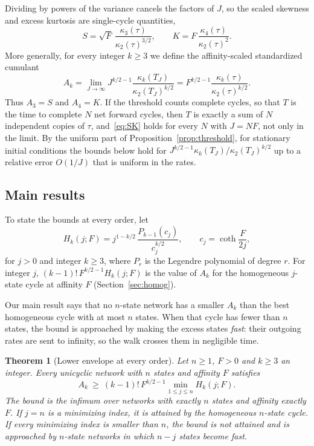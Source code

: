 \documentclass[11pt]{article}
\newtheorem{theorem}{Theorem}
\theoremstyle{remark}
\begin{document}
Dividing by powers of the variance cancels the factors of $J$, so the scaled
skewness and excess kurtosis are single-cycle quantities,
\begin{equation}\label{eq:SK}
S=\sqrt F\,\frac{\kappa_3(\tau)}{\kappa_2(\tau)^{3/2}},\qquad
K=F\,\frac{\kappa_4(\tau)}{\kappa_2(\tau)^2}.
\end{equation}
More generally, for every integer $k\ge3$ we define the affinity-scaled
standardized cumulant
\begin{equation}\label{eq:Ak}
A_k=\lim_{J\to\infty}J^{k/2-1}\frac{\kappa_k(T_J)}{\kappa_2(T_J)^{k/2}}
=F^{k/2-1}\frac{\kappa_k(\tau)}{\kappa_2(\tau)^{k/2}}.
\end{equation}
Thus $A_3=S$ and $A_4=K$. If the threshold counts complete cycles, so that
$T$ is the time to complete $N$ net forward cycles, then $T$ is exactly a sum
of $N$ independent copies of $\tau$, and~\eqref{eq:SK} holds for every $N$
with $J=NF$, not only in the limit. By the uniform part of
Proposition~\ref{prop:threshold}, for stationary initial conditions the
bounds below hold for $J^{k/2-1}\kappa_k(T_J)/\kappa_2(T_J)^{k/2}$ up to a
relative error $O(1/J)$ that is uniform in the rates.

\subsection{Main results}

To state the bounds at every order, let
\begin{equation}\label{eq:Hk}
H_k(j;F)=j^{1-k/2}\,\frac{P_{k-1}(c_j)}{c_j^{k/2}},\qquad
c_j=\coth\frac F{2j},
\end{equation}
for $j>0$ and integer $k\ge3$, where $P_r$ is the Legendre polynomial of
degree $r$. For integer $j$, $(k-1)!\,F^{k/2-1}H_k(j;F)$ is the value of
$A_k$ for the homogeneous $j$-state cycle at affinity $F$
(Section~\ref{sec:homog}).

Our main result says that no $n$-state network has a smaller $A_k$ than the
best homogeneous cycle with at most $n$ states. When that cycle has fewer
than $n$ states, the bound is approached by making the excess states
\emph{fast}: their outgoing rates are sent to infinity, so the walk crosses
them in negligible time.

\begin{theorem}[Lower envelope at every order]\label{thm:allorder}
Let $n\ge1$, $F>0$ and $k\ge3$ an integer. Every unicyclic network with $n$
states and affinity $F$ satisfies
\begin{equation}\label{eq:allorder}
A_k\ \ge\ (k-1)!\,F^{k/2-1}\min_{1\le j\le n}H_k(j;F).
\end{equation}
The bound is the infimum over networks with exactly $n$ states and affinity
exactly $F$. If $j=n$ is a minimizing index, it is attained by the
homogeneous $n$-state cycle. If every minimizing index is smaller than $n$,
the bound is not attained and is approached by $n$-state networks in which
$n-j$ states become fast.
\end{theorem}
\end{document}
